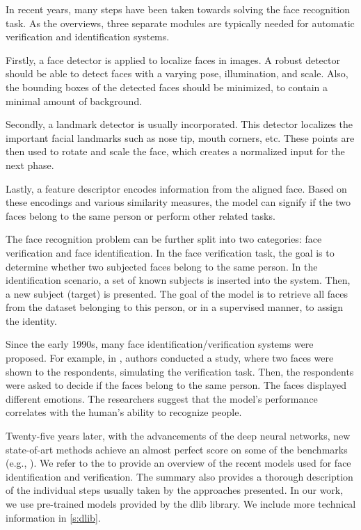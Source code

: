 In recent years, many steps have been taken towards solving the face recognition task. As the \cite{ranjan2018deep} overviews, three separate modules are typically needed for automatic verification and identification systems. 

Firstly, a face detector is applied to localize faces in images. A robust detector should be able to detect faces with a varying pose, illumination, and scale. Also, the bounding boxes of the detected faces should be minimized, to contain a minimal amount of background. 

Secondly, a landmark detector is usually incorporated. This detector localizes the important facial landmarks such as nose tip, mouth corners, etc. These points are then used to rotate and scale the face, which creates a normalized input for the next phase. 

Lastly, a feature descriptor encodes information from the aligned face. Based on these encodings and various similarity measures, the model can signify if the two faces belong to the same person or perform other related tasks.

The face recognition problem can be further split into two categories: face verification and face identification. In the face verification task, the goal is to determine whether two subjected faces belong to the same person. In the identification scenario,
a set of known subjects is inserted into the system. Then, a new subject (target) is presented. The goal of the model is to retrieve all faces from the dataset belonging to this person, or in a supervised manner, to assign the identity.

Since the early 1990s, many face identification/verification systems were proposed. For example, in \citep{kalocsai1998face}, authors conducted a study, where two faces were shown to the respondents, simulating the verification task. Then, the respondents were asked to decide if the faces belong to the same person. The faces displayed different emotions. The researchers suggest that the model's performance correlates with the human's ability to recognize people.

Twenty-five years later, with the advancements of the deep neural networks, new state-of-art methods achieve an almost perfect score on some of the benchmarks (e.g., \citep{huang2008labeled}). We refer to the \citep{masi2018deep} to provide an overview of the recent models used for face identification and verification. The summary also provides a thorough description of the individual steps usually taken by the approaches presented. In our work, we use pre-trained models provided by the dlib library. We include more technical information in  \autoref{s:dlib}.

